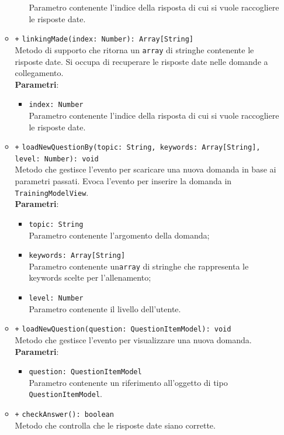 \begin{itemize}
\begin{itemize}
\begin{itemize}
			Parametro contenente l'indice della risposta di cui si vuole raccogliere le risposte date. 
		\end{itemize}
		\item \texttt{+} \texttt{linkingMade(index: Number): Array[String]} \\
		Metodo di supporto che ritorna un \texttt{array} di stringhe contenente le risposte date. Si occupa di recuperare le risposte date nelle domande a collegamento.\\
		\textbf{Parametri}:
		\begin{itemize}
			\item \texttt{index: Number} \\
			Parametro contenente l'indice della risposta di cui si vuole raccogliere le risposte date. 
		\end{itemize}
		\item \texttt{+} \texttt{loadNewQuestionBy(topic: String, keywords: Array[String], level: Number): void} \\
		Metodo che gestisce l'evento per scaricare una nuova domanda in base ai parametri passati. Evoca l'evento per inserire la domanda in \texttt{TrainingModelView}. \\
		\textbf{Parametri}:
		\begin{itemize}
			\item \texttt{topic: String} \\
			Parametro contenente l'argomento della domanda;
			\item \texttt{keywords: Array[String]} \\
			Parametro contenente un\texttt{array} di stringhe che rappresenta le keywords scelte per l'allenamento;
			\item \texttt{level: Number} \\
			Parametro contenente il livello dell'utente.
		\end{itemize}
		\item \texttt{+} \texttt{loadNewQuestion(question: QuestionItemModel): void} \\
		Metodo che gestisce l'evento per visualizzare una nuova domanda. \\
		\textbf{Parametri}:
		\begin{itemize}
			\item \texttt{question: QuestionItemModel} \\
			Parametro contenente un riferimento all'oggetto di tipo \texttt{QuestionItemModel}.
		\end{itemize}
		\item \texttt{+} \texttt{checkAnswer(): boolean} \\ 
		Metodo che controlla che le risposte date siano corrette.
	\end{itemize}
\end{itemize}

	